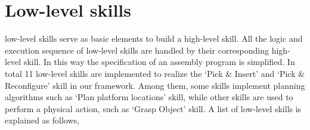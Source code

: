 \section{Low-level skills}

low-level skills serve as basic elements to build a high-level skill. All the logic and execution sequence of low-level skills are handled by their corresponding high-level skill. In this way the specification of an assembly program is simplified. In total 11 low-level skills are implemented to realize the `Pick \& Insert' and `Pick \& Reconfigure' skill in our framework. Among them, some skills implement planning algorithms such as `Plan platform locations' skill, while other skills are used to  perform a physical action, such as `Grasp Object' skill. A list of low-level skills is explained as follows,

